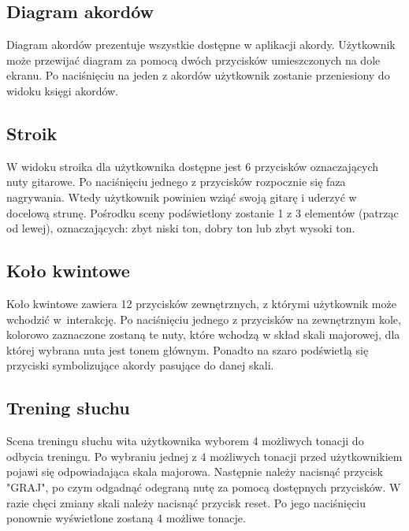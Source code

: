 \subsection{Diagram akordów}

Diagram akordów prezentuje wszystkie dostępne w aplikacji akordy. Użytkownik może przewijać diagram za pomocą dwóch przycisków umieszczonych na dole ekranu. Po naciśnięciu na jeden z akordów użytkownik zostanie przeniesiony do widoku księgi akordów.
\subsection{Stroik}

W widoku stroika dla użytkownika dostępne jest 6 przycisków oznaczających nuty gitarowe. Po naciśnięciu jednego z przycisków rozpocznie się faza nagrywania. Wtedy użytkownik powinien wziąć swoją gitarę i uderzyć w docelową strunę. Pośrodku sceny podświetlony zostanie 1 z 3 elementów (patrząc od lewej), oznaczających: zbyt niski ton, dobry ton lub zbyt wysoki ton.
\subsection{Koło kwintowe}

Koło kwintowe zawiera 12 przycisków zewnętrznych, z którymi użytkownik może wchodzić w~interakcję. Po naciśnięciu jednego z przycisków na zewnętrznym kole, kolorowo zaznaczone zostaną te nuty, które wchodzą w skład skali majorowej, dla której wybrana nuta jest tonem głównym. Ponadto na szaro podświetlą się przyciski symbolizujące akordy pasujące do danej skali.
\subsection{Trening słuchu}

Scena treningu słuchu wita użytkownika wyborem 4 możliwych tonacji do odbycia treningu. Po wybraniu jednej z 4 możliwych tonacji przed użytkownikiem pojawi się odpowiadająca skala majorowa. Następnie należy nacisnąć przycisk "GRAJ", po czym odgadnąć odegraną nutę za pomocą dostępnych przycisków. W razie chęci zmiany skali należy nacisnąć przycisk reset. Po jego naciśnięciu ponownie wyświetlone zostaną 4 możliwe tonacje.
